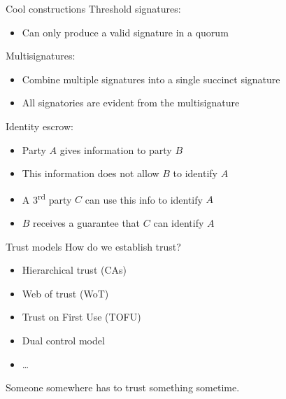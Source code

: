 \begin{frame}{Cool constructions}
  \pause
  Threshold signatures:
  \begin{itemize}
    \item Can only produce a valid signature in a quorum
  \end{itemize}

  \pause
  Multisignatures:
  \begin{itemize}
    \item Combine multiple signatures into a single succinct signature
    \item All signatories are evident from the multisignature
  \end{itemize}

  \pause
  Identity escrow:
  \begin{itemize}
    \item Party $A$ gives information to party $B$
    \item This information does not allow $B$ to identify $A$
    \item A 3\textsuperscript{rd} party $C$ can use this info to identify $A$
    \item $B$ receives a guarantee that $C$ can identify $A$
  \end{itemize}
\end{frame}

\begin{frame}{Trust models}
  How do we establish trust?
  \begin{itemize}[<+(1)->]
    \item Hierarchical trust (CAs)
    \item Web of trust (WoT)
    \item Trust on First Use (TOFU)
    \item Dual control model
    \item \dots
  \end{itemize}

  \pause
  Someone somewhere has to trust something sometime.
\end{frame}

